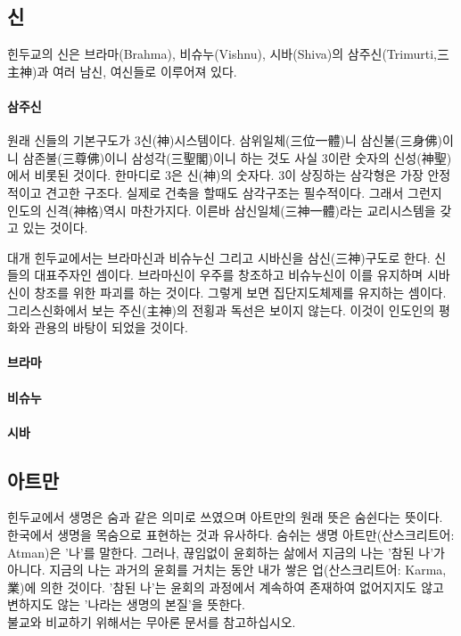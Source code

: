 \documentclass[12pt, a4paper, oneside]{book}
\begin{document}
\subsection{신}
힌두교의 신은 브라마(Brahma), 비슈누(Vishnu), 시바(Shiva)의 삼주신(Trimurti,三主神)과 여러 남신, 여신들로 이루어져 있다.

	\paragraph{삼주신}
	원래 신들의 기본구도가 3신(神)시스템이다. 
	삼위일체(三位一體)니 삼신불(三身佛)이니 삼존불(三尊佛)이니 삼성각(三聖閣)이니 하는 것도 사실 3이란 숫자의 신성(神聖)에서 비롯된 것이다. 
	한마디로 3은 신(神)의 숫자다. 
	3이 상징하는 삼각형은 가장 안정적이고 견고한 구조다. 
	실제로 건축을 할때도 삼각구조는 필수적이다. 
	그래서 그런지 인도의 신격(神格)역시 마찬가지다. 
	이른바 삼신일체(三神一體)라는 교리시스템을 갖고 있는 것이다. 

		대개 힌두교에서는 브라마신과 비슈누신 그리고 시바신을 삼신(三神)구도로 한다.
		신들의 대표주자인 셈이다. 
		브라마신이 우주를 창조하고 비슈누신이 이를 유지하며 시바신이 창조를 위한 파괴를 하는 것이다. 
		그렇게 보면 집단지도체제를 유지하는 셈이다. 
		그리스신화에서 보는 주신(主神)의 전횡과 독선은 보이지 않는다. 
		이것이 인도인의 평화와 관용의 바탕이 되었을 것이다.

	\paragraph{브라마}
	\paragraph{비슈누}
	\paragraph{시바}




\subsection{아트만}
힌두교에서 생명은 숨과 같은 의미로 쓰였으며 아트만의 원래 뜻은 숨쉰다는 뜻이다. 
한국에서 생명을 목숨으로 표현하는 것과 유사하다. 
숨쉬는 생명 아트만(산스크리트어: Atman)은 '나'를 말한다. 
그러나, 끊임없이 윤회하는 삶에서 지금의 나는 '참된 나'가 아니다. 
지금의 나는 과거의 윤회를 거치는 동안 내가 쌓은 업(산스크리트어: Karma, 業)에 의한 것이다.
'참된 나'는 윤회의 과정에서 계속하여 존재하여 없어지지도 않고 변하지도 않는 '나라는 생명의 본질'을 뜻한다.\\
불교와 비교하기 위해서는 무아론 문서를 참고하십시오.
\end{document}
